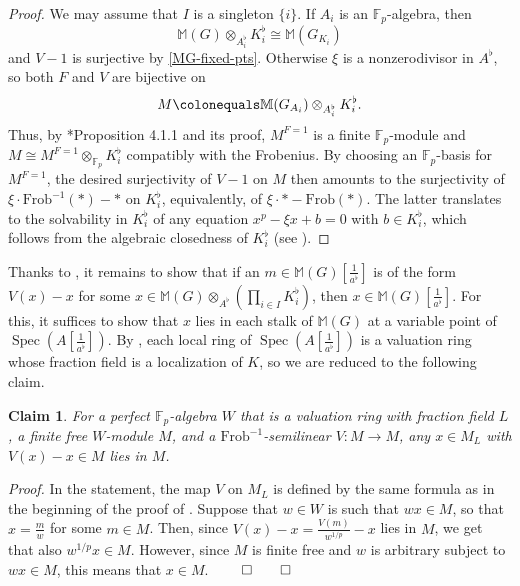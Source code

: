 \documentclass[11pt, reqno]{amsart}
\newcommand{\bF}{\mathbb{F}}
\newcommand{\bM}{\mathbb{M}}
\DeclareMathOperator{\Spec}{Spec}		%
\newcommand{\ce}{\colonequals}
\newcommand{\Frob}{\mathrm{Frob}}			%
\renewcommand{\i}{^{-1}}
\newcommand{\ra}{\rightarrow}
\newcommand{\tensor}{\otimes} 			%
\providecommand{\f}[2]{\frac{#1}{#2}}
\newcommand{\bcl}{\begin{claim}}
\newcommand{\ecl}{\end{claim}}
\newcommand{\bpf}{\begin{proof}}
\newcommand{\epf}{\end{proof}}
\newcommand*{\QEDD}{\hfill\ensuremath{\qed\qed}}
\numberwithin{equation}{numberingbase}
\theoremstyle{thms}
\theoremstyle{claims}
\newtheorem{claim}[equation]{Claim}
\theoremstyle{defs}
\theoremstyle{thms}
\theoremstyle{defs}
\theoremstyle{subsection-tweak}
\theoremstyle{subsection-tweak}
\begin{document}
\bpf
We may assume that $I$ is a singleton $\{ i \}$. If $A_i$ is an $\bF_p$-algebra, then 
\[
\bM(G) \tensor_{A_i^\flat} K_i^\flat \cong \bM(G_{K_i})
\]
and $V - 1$ is surjective by \eqref{MG-fixed-pts}. %
Otherwise $\xi$ is a nonzerodivisor in $A^\flat$, so both $F$ and $V$ are bijective on 
\[
M \ce \bM(G_{A_i}) \tensor_{A_i^\flat} K_i^\flat.
\]
Thus, by \cite{Kat73}*{Proposition 4.1.1 and its proof}, $M^{F = 1}$ is a finite $\bF_p$-module and $M \cong M^{F = 1} \tensor_{\bF_p} K_i^\flat$ compatibly with the Frobenius. By choosing an $\bF_p$-basis for $M^{F = 1}$, the desired surjectivity of $V - 1$ on $M$ then amounts to the surjectivity of $\xi \cdot \Frob\i(*) - *$ on $K_i^\flat$, equivalently, of $\xi \cdot * - \Frob(*)$. The latter translates to the solvability in $K_i^\flat$ of any equation $x^p - \xi x + b = 0$  with $b \in K_i^\flat$, which follows from the algebraic closedness of $K_i^\flat$ (see ).%
\epf 


Thanks to , 
it remains to show that if an $m \in \bM(G)[\f 1{a^\flat}]$ is of the form $V(x) - x$ for some $x \in \bM(G) \tensor_{A^\flat} (\prod_{i \in I} K_i^\flat)$, then $x \in \bM(G)[\f 1{a^\flat}]$. For this, it suffices to show that $x$ lies in each stalk of $\bM(G)$ at a variable point of $\Spec(A[\f 1{a^\flat}])$. %
By , each local ring of $\Spec(A[\f 1{a^\flat}])$ is a valuation ring whose fraction field is a localization of $K$, so we are reduced to the following claim.

\bcl
For a perfect $\bF_p$-algebra $W$ that is a valuation ring with fraction field $L$, a finite free $W$-module $M$, and a $\Frob\i$-semilinear $V \colon M \ra M$, any $x \in M_L$ with $V(x) - x \in M$ lies in $M$.
\ecl

\emph{Proof. }
In the statement, the map $V$ on $M_L$ is defined by the same formula as in the beginning of the proof of . Suppose that $w \in W$ is such that $wx \in M$, so that $x = \f{m}{w}$ for some $m \in M$. Then, since $V(x) - x = \f{V(m)}{w^{1/p}} - x$ lies in $M$, we get that also $w^{1/p}x \in M$. However, since $M$ is finite free and $w$ is arbitrary subject to $wx \in M$, this means that $x \in M$.
\QEDD
\end{document}
